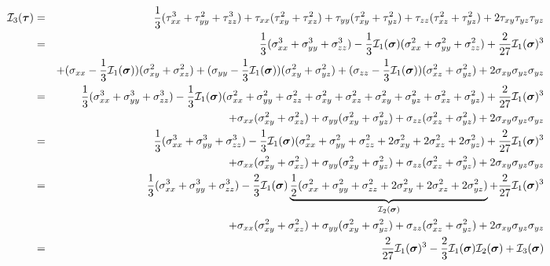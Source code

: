 \begin{eqnarray}
{\cal I}_3(\bm\tau) 
&=& 
\frac{1}{3}(\tau_{xx}^3 + \tau_{yy}^2 + \tau_{zz}^3) 
+\tau_{xx}(\tau_{xy}^2 + \tau_{xz}^2 ) 
+\tau_{yy}(\tau_{xy}^2 + \tau_{yz}^2 ) 
+\tau_{zz}(\tau_{xz}^2 + \tau_{yz}^2 ) 
+2\tau_{xy}\tau_{yz}\tau_{yz} \nonumber\\
&=& 
\frac{1}{3}(\sigma_{xx}^3 + \sigma_{yy}^3 + \sigma_{zz}^3)
-\frac13{\cal I}_1(\bm\sigma) (\sigma_{xx}^2+\sigma_{yy}^2+\sigma_{zz}^2)
+\frac{2}{27} {\cal I}_1(\bm\sigma)^3 \nonumber\\
&& 
+(\sigma_{xx}-\frac13 {\cal I}_1(\bm\sigma))(\sigma_{xy}^2 + \sigma_{xz}^2 ) 
+(\sigma_{yy}-\frac13 {\cal I}_1(\bm\sigma))(\sigma_{xy}^2 + \sigma_{yz}^2 ) 
+(\sigma_{zz}-\frac13 {\cal I}_1(\bm\sigma))(\sigma_{xz}^2 + \sigma_{yz}^2 ) 
+2\sigma_{xy}\sigma_{yz}\sigma_{yz} \nonumber\\
&=& 
\frac{1}{3}(\sigma_{xx}^3 + \sigma_{yy}^3 + \sigma_{zz}^3)
-\frac13{\cal I}_1(\bm\sigma) (\sigma_{xx}^2+\sigma_{yy}^2+\sigma_{zz}^2
+ \sigma_{xy}^2 + \sigma_{xz}^2
+\sigma_{xy}^2 + \sigma_{yz}^2
+\sigma_{xz}^2 + \sigma_{yz}^2 
)
+\frac{2}{27} {\cal I}_1(\bm\sigma)^3 \nonumber\\
&& 
+\sigma_{xx}(\sigma_{xy}^2 + \sigma_{xz}^2 ) 
+\sigma_{yy}(\sigma_{xy}^2 + \sigma_{yz}^2 ) 
+\sigma_{zz}(\sigma_{xz}^2 + \sigma_{yz}^2 ) 
+2\sigma_{xy}\sigma_{yz}\sigma_{yz} \nonumber\\
&=& 
\frac{1}{3}(\sigma_{xx}^3 + \sigma_{yy}^3 + \sigma_{zz}^3)
-\frac13{\cal I}_1(\bm\sigma) (\sigma_{xx}^2+\sigma_{yy}^2+\sigma_{zz}^2
+ 2\sigma_{xy}^2 + 2\sigma_{xz}^2 + 2\sigma_{yz}^2  )
+\frac{2}{27} {\cal I}_1(\bm\sigma)^3 \nonumber\\
&& 
+\sigma_{xx}(\sigma_{xy}^2 + \sigma_{xz}^2 ) 
+\sigma_{yy}(\sigma_{xy}^2 + \sigma_{yz}^2 ) 
+\sigma_{zz}(\sigma_{xz}^2 + \sigma_{yz}^2 ) 
+2\sigma_{xy}\sigma_{yz}\sigma_{yz} \nonumber\\
&=& 
\frac{1}{3}(\sigma_{xx}^3 + \sigma_{yy}^3 + \sigma_{zz}^3)
-\frac23{\cal I}_1(\bm\sigma)
\underbrace{\frac12  (\sigma_{xx}^2+\sigma_{yy}^2+\sigma_{zz}^2
+ 2\sigma_{xy}^2 + 2\sigma_{xz}^2 + 2\sigma_{yz}^2  )}_{{\cal I}_2(\bm\sigma)}
+\frac{2}{27} {\cal I}_1(\bm\sigma)^3 \nonumber\\
&& 
+\sigma_{xx}(\sigma_{xy}^2 + \sigma_{xz}^2 ) 
+\sigma_{yy}(\sigma_{xy}^2 + \sigma_{yz}^2 ) 
+\sigma_{zz}(\sigma_{xz}^2 + \sigma_{yz}^2 ) 
+2\sigma_{xy}\sigma_{yz}\sigma_{yz} \nonumber\\
&=& \frac{2}{27}  {\cal I}_1(\bm\sigma)^3 - \frac23{\cal I}_1(\bm\sigma) {\cal I}_2(\bm\sigma)
+{\cal I}_3(\bm\sigma) \nonumber
\end{eqnarray}

